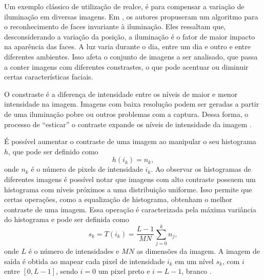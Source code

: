 
Um exemplo clássico de utilização de realce, é para compensar a variação de iluminação em diversas imagens. Em , os autores propuseram um algoritmo para o reconhecimento de faces invariante à iluminação. Eles ressaltam que, desconsiderando a variação da posição, a iluminação é o fator de maior impacto na aparência das faces. A luz varia durante o dia, entre um dia e outro e entre diferentes ambientes. Isso afeta o conjunto de imagens a ser analisado, que passa a conter imagens com diferentes constrastes, o que pode acentuar ou diminuir certas características faciais.

O constraste é a diferença de intensidade entre os níveis de maior e menor intensidade na imagem. Imagens com baixa resolução podem ser geradas a partir de uma iluminação pobre ou outros problemas com a captura. Dessa forma, o processo de ``esticar'' o contraste expande os níveis de intensidade da imagem \cite{Gonzalez2007}.


É possível aumentar o contraste de uma imagem ao manipular o seu histograma $h$, que pode ser definido como
\begin{equation*}
h(i_k) = n_k,
\end{equation*}
\noindent onde $n_k$ é o número de pixels de intensidade $i_k$. Ao observar os histogramas de diferentes imagens é possível notar que imagens com alto contraste possuem um histograma com níveis próximos a uma distribuição uniforme. Isso permite que certas operações, como a equalização de histograma, obtenham o melhor contraste de uma imagem. Essa operação é caracterizada pela máxima variância do histograma e pode ser definida como
\begin{equation}
s_k = T(i_k) = \frac{L-1}{MN} \sum_{j=0}^{k}n_j,
\end{equation}
\noindent onde $L$ é o número de intensidades e $MN$ as dimensões da imagem. A imagem de saída é obtida ao mapear cada pixel de intensidade $i_k$ em um nível $s_k$, com $i$ entre $[0,L-1]$, sendo $i = 0$ um pixel preto e $i = L-1$, branco \cite{Gonzalez2007}.

